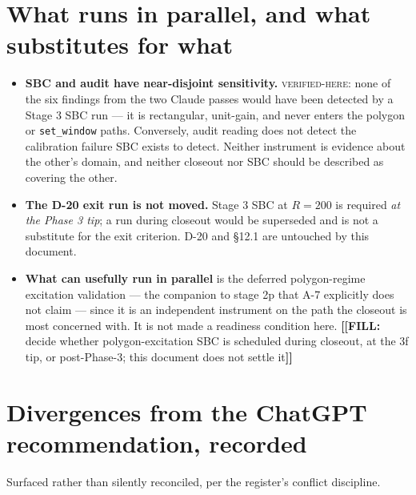 \documentclass[11pt]{article}
\newcommand{\fillanchor}[1]{{\color{red}\textbf{[[FILL:} #1\textbf{]]}}}
\newcommand{\vfy}{\textsc{verified-here}}
\renewcommand{\tt}[1]{\texttt{#1}}
\begin{document}
\section{What runs in parallel, and what substitutes for what}

\begin{itemize}
  \item \textbf{SBC and audit have near-disjoint sensitivity.} \vfy: none of the six
  findings from the two Claude passes would have been detected by a Stage 3 SBC run ---
  it is rectangular, unit-gain, and never enters the polygon or \tt{set\_window} paths.
  Conversely, audit reading does not detect the calibration failure SBC exists to detect.
  Neither instrument is evidence about the other's domain, and neither closeout nor SBC
  should be described as covering the other.
  \item \textbf{The D-20 exit run is not moved.} Stage 3 SBC at $R=200$ is required
  \emph{at the Phase 3 tip}; a run during closeout would be superseded and is not a
  substitute for the exit criterion. D-20 and \S12.1 are untouched by this document.
  \item \textbf{What can usefully run in parallel} is the deferred polygon-regime
  excitation validation --- the companion to stage 2p that A-7 explicitly does not claim
  --- since it is an independent instrument on the path the closeout is most concerned
  with. It is not made a readiness condition here.
  \fillanchor{decide whether polygon-excitation SBC is scheduled during closeout, at the
  3f tip, or post-Phase-3; this document does not settle it}
\end{itemize}

\section{Divergences from the ChatGPT recommendation, recorded}

Surfaced rather than silently reconciled, per the register's conflict discipline.
\end{document}
